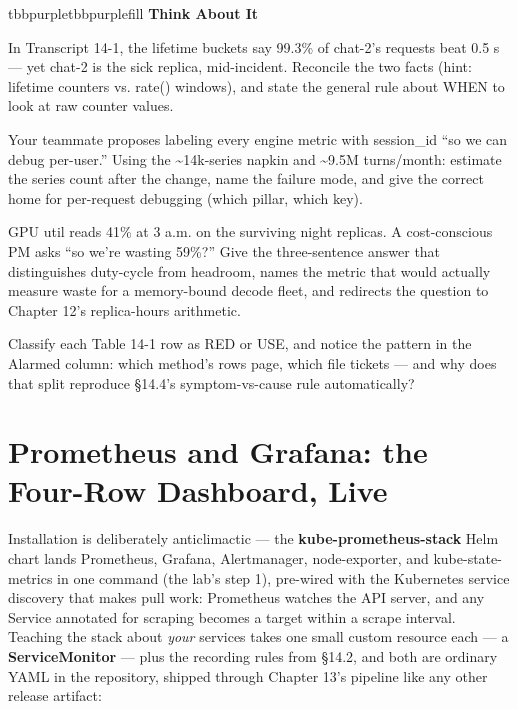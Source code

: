 \begin{calloutbox}{tbbpurple}{tbbpurplefill}
{\normalsize\bfseries\color{tbbpurple}Think About It}\par\vspace{3pt}
\begin{tbbitemize}
  \item In Transcript 14-1, the lifetime buckets say 99.3\% of chat-2’s requests beat 0.5 s — yet chat-2 is the sick replica, mid-incident. Reconcile the two facts (hint: lifetime counters vs. rate() windows), and state the general rule about WHEN to look at raw counter values.
  \item Your teammate proposes labeling every engine metric with session\_id “so we can debug per-user.” Using the \textasciitilde{}14k-series napkin and \textasciitilde{}9.5M turns/month: estimate the series count after the change, name the failure mode, and give the correct home for per-request debugging (which pillar, which key).
  \item GPU util reads 41\% at 3 a.m. on the surviving night replicas. A cost-conscious PM asks “so we’re wasting 59\%?” Give the three-sentence answer that distinguishes duty-cycle from headroom, names the metric that would actually measure waste for a memory-bound decode fleet, and redirects the question to Chapter 12’s replica-hours arithmetic.
  \item Classify each Table 14-1 row as RED or USE, and notice the pattern in the Alarmed column: which method’s rows page, which file tickets — and why does that split reproduce §14.4’s symptom-vs-cause rule automatically?
\end{tbbitemize}
\end{calloutbox}

\section{Prometheus and Grafana: the Four-Row Dashboard, Live}

Installation is deliberately anticlimactic — the \textbf{kube-prometheus-stack} Helm chart lands Prometheus, Grafana, Alertmanager, node-exporter, and kube-state-metrics in one command (the lab’s step 1), pre-wired with the Kubernetes service discovery that makes pull work: Prometheus watches the API server, and any Service annotated for scraping becomes a target within a scrape interval. Teaching the stack about \textit{your} services takes one small custom resource each — a \textbf{ServiceMonitor} — plus the recording rules from §14.2, and both are ordinary YAML in the repository, shipped through Chapter 13’s pipeline like any other release artifact:


